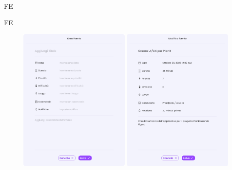 \begin{listaPersonale}{FE}
\begin{listaPersonale2}{FE}

        \begin{center} 
            \begin{figure}[H]
            \centering\includegraphics[width=0.49\textwidth,height=0.35\textheight]{img/FrontEnd/Eventi/Evento/CreaEvento.png}
            \centering\includegraphics[width=0.49\textwidth,height=0.35\textheight]{img/FrontEnd/Eventi/Evento/ModificaEvento.png}
            \end{figure}
        \end{center}

        


\end{listaPersonale2}
\end{listaPersonale}
